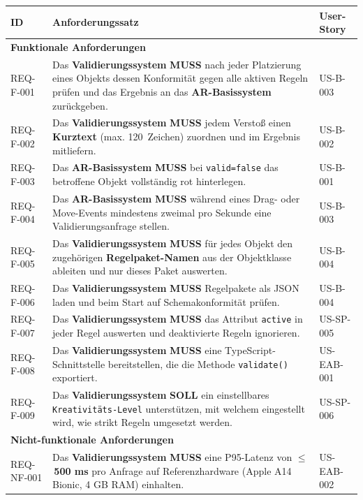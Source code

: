 
\begin{longtable}{| p{3cm} | p{9cm} | p{2cm} |}
\hline
\textbf{ID} & \textbf{Anforderungssatz} & \textbf{User-Story} \\ 
\hline\hline
\multicolumn{2}{|l|}{\textbf{Funktionale Anforderungen}} \\
\hline
REQ-F-001 & Das \textbf{Validierungssystem} \textbf{MUSS} nach jeder Platzierung eines Objekts dessen Konformität gegen alle aktiven Regeln prüfen und das Ergebnis an das \textbf{AR-Basissystem} zurückgeben. & US-B-003 \\ \hline
REQ-F-002 & Das \textbf{Validierungssystem} \textbf{MUSS} jedem Verstoß einen \textbf{Kurztext} (max. 120~Zeichen) zuordnen und im Ergebnis mitliefern. & US-B-002 \\ \hline
REQ-F-003 & Das \textbf{AR-Basissystem} \textbf{MUSS} bei \verb|valid=false| das betroffene Objekt vollständig rot hinterlegen. & US-B-001 \\ \hline
REQ-F-004 & Das \textbf{AR-Basissystem} \textbf{MUSS} während eines Drag- oder Move-Events mindestens zweimal pro Sekunde eine Validierungsanfrage stellen. & US-B-003 \\ \hline
REQ-F-005 & Das \textbf{Validierungssystem} \textbf{MUSS} für jedes Objekt den zugehörigen \textbf{Regelpaket-Namen} aus der Objektklasse ableiten und nur dieses Paket auswerten. & US-B-004 \\ \hline
REQ-F-006 & Das \textbf{Validierungssystem} \textbf{MUSS} Regelpakete als JSON laden und beim Start auf Schemakonformität prüfen. & US-B-004 \\ \hline
REQ-F-007 & Das \textbf{Validierungssystem} \textbf{MUSS} das Attribut \verb|active| in jeder Regel auswerten und deaktivierte Regeln ignorieren. & US-SP-005 \\ \hline
REQ-F-008 & Das \textbf{Validierungssystem} \textbf{MUSS} eine TypeScript-Schnittstelle bereitstellen, die die Methode \verb|validate()| exportiert. & US-EAB-001 \\ \hline
REQ-F-009 & Das \textbf{Validierungssystem} \textbf{SOLL} ein einstellbares \verb|Kreativitäts-Level| unterstützen, mit welchem eingestellt wird, wie strikt Regeln umgesetzt werden. & US-SP-006 \\ 
\hline\hline
\multicolumn{2}{|l|}{\textbf{Nicht-funktionale Anforderungen}} \\ 
\hline
REQ-NF-001 & Das \textbf{Validierungssystem} \textbf{MUSS} eine P95-Latenz von \textbf{$\leq$\,500 ms} pro Anfrage auf Referenzhardware (Apple A14 Bionic, 4 GB RAM) einhalten.& US-EAB-002 \\ \hline

\end{longtable}
